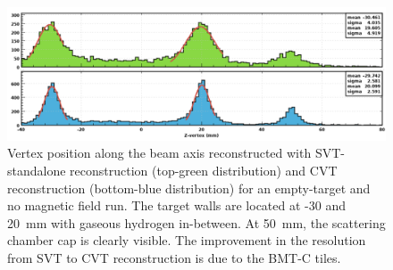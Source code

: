 \begin{figure}[htb]
 \includegraphics[width=2.0\columnwidth,keepaspectratio]{images/NIM_SVTvsCVT.png}
 \caption{Vertex position along the beam axis reconstructed with SVT-standalone reconstruction (top-green distribution) and CVT reconstruction (bottom-blue distribution) for an empty-target and no magnetic field run. The target walls are located at -30 and 20~mm with gaseous hydrogen in-between. At 50~mm, the scattering chamber cap is clearly visible. The improvement in the resolution from SVT to CVT reconstruction is due to the BMT-C tiles.}
 \label{fig:mm-zvertex}
\end{figure}
